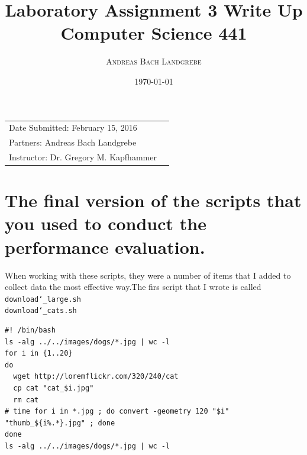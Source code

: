 \documentclass{article}
\title{Laboratory Assignment 3 Write Up \\ Computer Science 441} %
\author{\textsc{Andreas Bach Landgrebe} \\} %
\date{\today} %
\begin{document}
\maketitle %

\begin{center}
\begin{tabular}{l r}
Date Submitted:  February 15, 2016 \\ %
Partners:  Andreas Bach Landgrebe  \\ %
Instructor:  Dr. Gregory M. Kapfhammer  %
\end{tabular}
\end{center}



\section{The final version of the scripts that you used to conduct the performance evaluation.}

When working with these scripts, they were a number of items that I added to collect data the most effective way.The firs script that I wrote is called \texttt{download\char`_large.sh}
\\
\texttt{download\char`_cats.sh}
\begin{lstlisting}
#! /bin/bash
ls -alg ../../images/dogs/*.jpg | wc -l
for i in {1..20}
do
  wget http://loremflickr.com/320/240/cat
  cp cat "cat_$i.jpg"
  rm cat
# time for i in *.jpg ; do convert -geometry 120 "$i" "thumb_${i%.*}.jpg" ; done
done
ls -alg ../../images/dogs/*.jpg | wc -l
\end{lstlisting}
\end{document}
